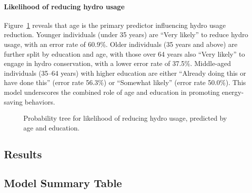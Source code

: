 \documentclass[
  letterpaper,
  DIV=11,
  numbers=noendperiod]{scrartcl}
\let\oldparagraph\paragraph
\renewcommand{\paragraph}[1]{\oldparagraph{#1}\mbox{}}
\begin{document}
\paragraph{Likelihood of reducing hydro
usage}\label{likelihood-of-reducing-hydro-usage}

Figure~\ref{fig-eighteen} reveals that age is the primary predictor
influencing hydro usage reduction. Younger individuals (under 35 years)
are ``Very likely'' to reduce hydro usage, with an error rate of 60.9\%.
Older individuals (35 years and above) are further split by education
and age, with those over 64 years also ``Very likely'' to engage in
hydro conservation, with a lower error rate of 37.5\%. Middle-aged
individuals (35--64 years) with higher education are either ``Already
doing this or have done this'' (error rate 56.3\%) or ``Somewhat
likely'' (error rate 50.0\%). This model underscores the combined role
of age and education in promoting energy-saving behaviors.

\begin{figure}


\caption{\label{fig-eighteen}Probability tree for likelihood of reducing
hydro usage, predicted by age and education.}

\end{figure}%

\subsection{Results}\label{sec-results}

\subsection{Model Summary Table}\label{model-summary-table}
\end{document}
